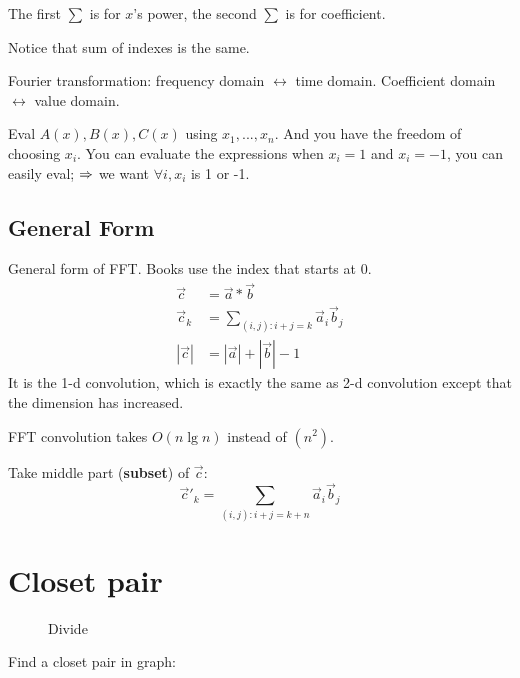 \documentclass[a4paper]{report}
\theoremstyle{definition}
\begin{document}
The first $\sum$ is for $x$'s power, the second $\sum$ is for coefficient. 

Notice that sum of indexes is the same.

Fourier transformation: frequency domain $\leftrightarrow$ time domain. Coefficient domain $\leftrightarrow$ value domain.

Eval $A(x), B(x), C(x)$ using $x_1, ..., x_n$. And you have the freedom of choosing $x_i$. You can evaluate the expressions when  $x_i=1$ and $x_i=-1$, you can easily eval; $\Rightarrow$ we want $\forall i, x_i$ is 1 or -1.
\subsection{General Form}
General form of FFT. Books use the index that starts at 0.
\begin{align*}
\vec c &= \vec a*\vec b \\
\vec c_k &= \sum_{(i,j): i+j=k} \vec a_i\vec b_j\\
|\vec c| &= |\vec a|+|\vec b| -1
\end{align*}
It is the 1-d convolution, which is exactly the same as 2-d convolution except that the dimension has increased.

FFT convolution takes $O(n \lg n)$ instead of $(n^2)$. 

Take middle part (\textbf{subset}) of $\vec c$:
$$
\vec c'_k =\sum_{(i,j): i+j= k+n} {\vec a_i \vec b_j}
$$

\section{Closet pair}
\begin{figure}[!htp]
\centering
{}
\caption{Divide}
\label{fig:5_6}
\end{figure}
Find a closet pair in graph:
\end{document}
